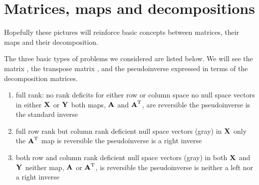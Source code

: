 \section{Matrices, maps and decompositions}
Hopefully these pictures will reinforce basic concepts between matrices, their maps and their decomposition.

The three basic types of problems we considered are listed below. We will see the matrix \svdl, the transpose matrix \svdl, and the pseudoinverse expressed in terms of the decomposition matrices.
\begin{enumerate}
%
\item full rank: no rank deficits for either row or column space
\subitem no null space vectors in either $\textbf{X}^{\mathrm{}}$ or $\textbf{Y}^{\mathrm{}}$
\subitem both maps, $\textbf{A}^{\mathrm{}}$ and $\textbf{A}^{\mathrm{T}}$, are reversible
\subitem the pseudoinverse is the standard inverse
%
\item full row rank but column rank deficient
\subitem null space vectors (gray) in  $\textbf{X}^{\mathrm{}}$
\subitem only the $\textbf{A}^{\mathrm{T}}$ map is reversible
\subitem the pseudoinverse is a right inverse
%
\item both row and column rank deficient 
\subitem null space vectors (gray) in both $\textbf{X}^{\mathrm{}}$ and $\textbf{Y}^{\mathrm{}}$
\subitem neither map, $\textbf{A}^{\mathrm{}}$ or $\textbf{A}^{\mathrm{T}}$, is reversible
\subitem the pseudoinverse is neither a left nor a right inverse
%
\end{enumerate}



\clearpage

